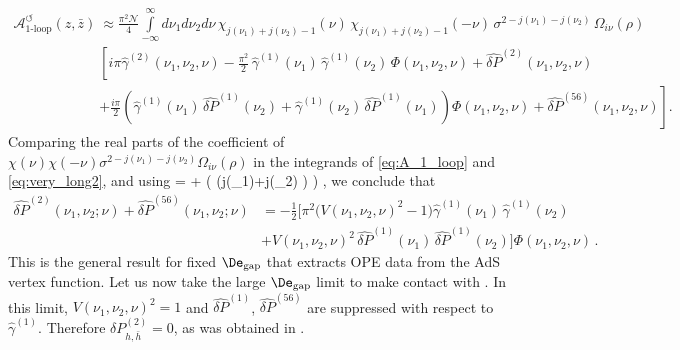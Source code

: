 \begin{align}
	\mathcal{A}_{\text{1-loop}}^{\circlearrowleft}(z,\bar{z}) & \approx \frac{\pi^2 \mathcal{N}}{4}\int\limits_{-\infty}^{\infty} d\nu_{1}d\nu_2d\nu \, \chi_{j(\nu_1)+j(\nu_2)-1}(\nu)\,\chi_{j(\nu_1)+j(\nu_2)-1}(-\nu) \,
	\sigma^{2-j(\nu_1)-j(\nu_2)} \,\Omega_{i\nu}(\rho) \nonumber                                                                                                                                                                                                                                                \\
	                                                          & \left[ i\pi \widehat{\gamma}^{(2)}(\nu_1,\nu_2,\nu)  -\frac{\pi^2}{2}\,\widehat{\gamma}^{(1)}(\nu_1)\,\widehat{\gamma}^{(1)}(\nu_2)\,\Phi(\nu_1,\nu_2,\nu) + \widehat{\delta P}^{(2)}(\nu_1,\nu_2,\nu) \right.
		\label{eq:very_long2}                                                                                                                                                                                                                                                                                       \\
	                                                          & \left. + \frac{i\pi}{2}\left(\widehat{\gamma}^{(1)}(\nu_1)\,\widehat{\delta P}^{(1)}(\nu_2) + \widehat{\gamma}^{(1)}(\nu_2)\,\widehat{\delta P}^{(1)}(\nu_1)\right)\Phi(\nu_1,\nu_2,\nu) + \widehat{\delta P}^{(56)}(\nu_1,\nu_2,\nu) \right] .
	\nonumber
\end{align}
Comparing the real parts of the coefficient of $\chi(\nu)\chi(-\nu)\sigma^{2-j(\nu_1)-j(\nu_2)} \Omega_{i\nu}(\rho)$ in the integrands of \eqref{eq:A_1_loop} and \eqref{eq:very_long2}, and using
\beq
{}
=  +  \tan \left(  \big(j(\nu_1)+j(\nu_2) \big) \right) ,
\label{eq:trig_ID}
\eeq
we conclude that
\begin{align}
	\widehat{\delta P}^{(2)}(\nu_1,\nu_2;\nu) + \widehat{\delta P}^{(56)}(\nu_1,\nu_2;\nu) & =
	-\frac{1}{2}\bigg[\pi^2 \Big(V(\nu_1,\nu_2,\nu)^2 -1\Big) \widehat{\gamma}^{(1)} (\nu_1)\, \widehat{\gamma}^{(1)} (\nu_2)
		\label{eq:deltaP2}                                                                         \\
	                                                                                       &
		+ V(\nu_1,\nu_2,\nu)^2\, \widehat{\delta P}^{(1)}(\nu_1)\,\widehat{\delta P}^{(1)}(\nu_2) \bigg] \Phi(\nu_1,\nu_2,\nu )  \,.
	\nonumber
\end{align}
This is the general result for fixed $\De_{\text{gap}}$ that extracts  OPE data from the AdS vertex function.
Let us now take the large $\De_{\text{gap}}$ limit to make contact with \cite{Meltzer:2019pyl}.
In this limit, $V(\nu_1,\nu_2,\nu)^2 =1$ and $\widehat{\delta P}^{(1)}$, $\widehat{\delta P}^{(56)}$ are suppressed with respect to
$\widehat{\gamma}^{(1)}$. Therefore $\delta{P}^{(2)}_{h,\bar{h}}=0$, as was obtained in \cite{Meltzer:2019pyl}.


